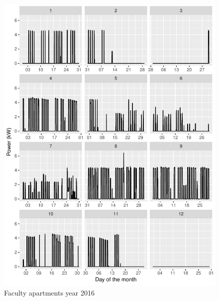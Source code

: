 \documentclass[11pt, oneside]{article}   	%
\begin{document}
\begin{figure}
\includegraphics[keepaspectratio]{fac_build_Y2016.pdf}
\caption{Faculty apartments  year 2016}
\end{figure}
\end{document}
